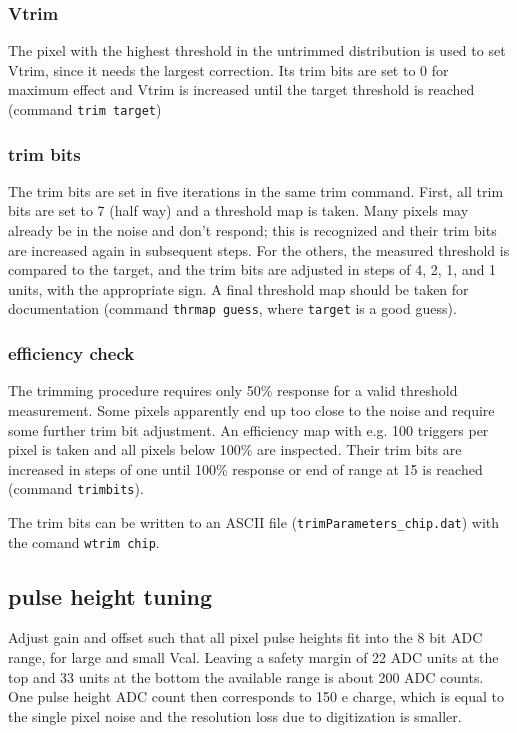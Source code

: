 \documentclass[english]{article}
\begin{document}
\subsubsection{Vtrim}

The pixel with the highest threshold in the untrimmed distribution
is used to set Vtrim, since it needs the largest correction. Its trim
bits are set to 0 for maximum effect and Vtrim is increased until
the target threshold is reached (command \texttt{trim target})


\subsubsection{trim bits}

The trim bits are set in five iterations in the same trim command.
First, all trim bits are set to 7 (half way) and a threshold map is
taken. Many pixels may already be in the noise and don't respond;
this is recognized and their trim bits are increased again in subsequent
steps. For the others, the measured threshold is compared to the target,
and the trim bits are adjusted in steps of 4, 2, 1, and 1 units, with
the appropriate sign. A final threshold map should be taken for documentation
(command \texttt{thrmap guess}, where \texttt{target} is a good guess).


\subsubsection{efficiency check}

The trimming procedure requires only 50\% response for a valid threshold
measurement. Some pixels apparently end up too close to the noise
and require some further trim bit adjustment. An efficiency map with
e.g. 100 triggers per pixel is taken and all pixels below 100\% are
inspected. Their trim bits are increased in steps of one until 100\%
response or end of range at 15 is reached (command \texttt{trimbits}).

The trim bits can be written to an ASCII file (\texttt{trimParameters\_chip.dat})
with the comand \texttt{wtrim chip}.


\subsection{pulse height tuning}

Adjust gain and offset such that all pixel pulse heights fit into
the 8 bit ADC range, for large and small Vcal. Leaving a safety margin
of 22 ADC units at the top and 33 units at the bottom the available
range is about 200 ADC counts. One pulse height ADC count then corresponds
to 150 e charge, which is equal to the single pixel noise and the
resolution loss due to digitization is smaller.
\end{document}
